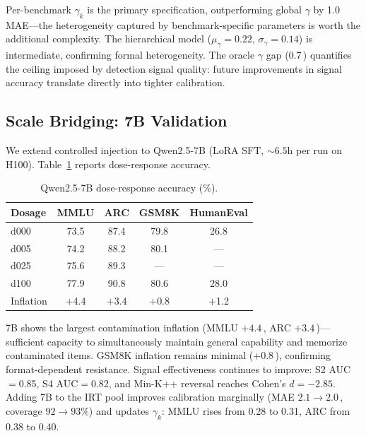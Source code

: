 \documentclass[11pt,a4paper]{article}
\newcommand{\pp}{\,\text{pp}}
\begin{document}
Per-benchmark $\gamma_k$ is the primary specification, outperforming global $\gamma$ by 1.0\pp{} MAE---the heterogeneity captured by benchmark-specific parameters is worth the additional complexity.
The hierarchical model ($\mu_\gamma=0.22$, $\sigma_\gamma=0.14$) is intermediate, confirming formal heterogeneity.
The oracle $\gamma$ gap (0.7\pp{}) quantifies the ceiling imposed by detection signal quality: future improvements in signal accuracy translate directly into tighter calibration.


\subsection{Scale Bridging: 7B Validation}
\label{sec:7b}

We extend controlled injection to Qwen2.5-7B (LoRA SFT, ${\sim}6.5$h per run on H100).
Table~\ref{tab:7b_dose} reports dose-response accuracy.

\begin{table}[t]
\centering
\small
\caption{Qwen2.5-7B dose-response accuracy (\%).}
\label{tab:7b_dose}
\begin{tabular}{lcccc}
\toprule
Dosage & MMLU & ARC & GSM8K & HumanEval \\
\midrule
d000 & 73.5 & 87.4 & 79.8 & 26.8 \\
d005 & 74.2 & 88.2 & 80.1 & --- \\
d025 & 75.6 & 89.3 & --- & --- \\
d100 & 77.9 & 90.8 & 80.6 & 28.0 \\
\midrule
Inflation & $+$4.4 & $+$3.4 & $+$0.8 & $+$1.2 \\
\bottomrule
\end{tabular}
\end{table}

7B shows the largest contamination inflation (MMLU $+4.4$\pp{}, ARC $+3.4$\pp{})---sufficient capacity to simultaneously maintain general capability and memorize contaminated items.
GSM8K inflation remains minimal ($+0.8$\pp{}), confirming format-dependent resistance.
Signal effectiveness continues to improve: S2 AUC$=$0.85, S4 AUC$=$0.82, and Min-K++ reversal reaches Cohen's $d=-2.85$.
Adding 7B to the IRT pool improves calibration marginally (MAE $2.1\to 2.0$\pp{}, coverage $92\to 93\%$) and updates $\gamma_k$: MMLU rises from 0.28 to 0.31, ARC from 0.38 to 0.40.
\end{document}
